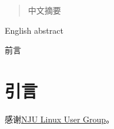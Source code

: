 \documentclass[
    ]{njuthesis}
\begin{document}

\maketitle 

\begin{abstract}
    中文摘要
\end{abstract}

\begin{abstract*}
    English abstract
\end{abstract*}

\begin{preface}
    前言
\end{preface}

\tableofcontents
\listoffigures
\listoftables

\mainmatter

%   
%   

\chapter{引言}


\printbibliography[
    heading=bibintoc,%
    title=参考文献]


\begin{acknowledgement}
    感谢\href{https://git.nju.edu.cn/nju-lug/lug-introduction}{NJU Linux User Group}。
\end{acknowledgement}
    

\appendix


\end{document}

